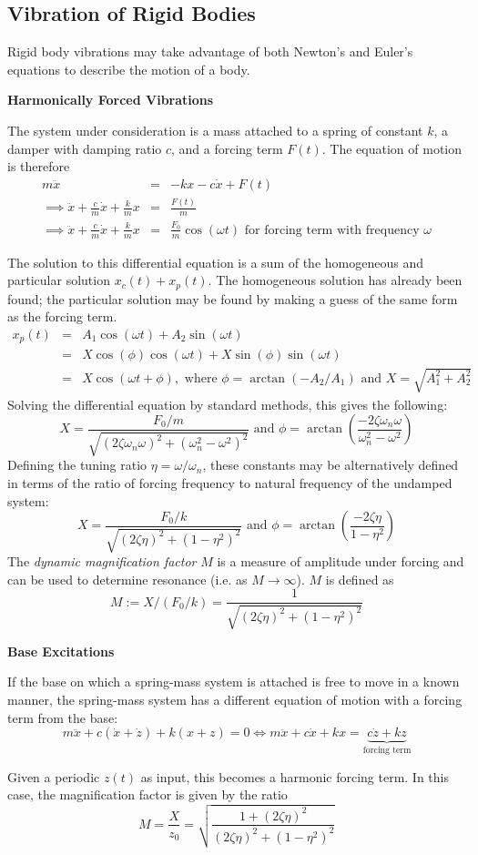 \subsection{Vibration of Rigid Bodies}

Rigid body vibrations may take advantage of both Newton's and Euler's equations to describe the motion of a body.

\textbf{Harmonically Forced Vibrations}

The system under consideration is a mass attached to a spring of constant $k$, a damper with damping ratio $c$, and a forcing term $F(t)$. The equation of motion is therefore \begin{eqnarray*}
    m\ddot x &=& -kx -c\dot x +F(t)\\
    \implies \ddot x + \frac{c}{m}\dot x + \frac{k}{m}x &=& \frac{F(t)}{m}\\
    \implies \ddot x + \frac{c}{m}\dot x + \frac{k}{m} x &=& \frac{F_0}{m}\cos(\omega t)\text{ for forcing term with frequency } \omega
\end{eqnarray*}

The solution to this differential equation is a sum of the homogeneous and particular solution $x_c(t) + x_p(t)$. The homogeneous solution has already been found; the particular solution may be found by making a guess of the same form as the forcing term.
\begin{eqnarray*}
    x_p(t) &=& A_1\cos(\omega t)+A_2\sin(\omega t)\\
    &=& X\cos(\phi)\cos(\omega t)+X\sin(\phi)\sin(\omega t)\\
    &=& X\cos(\omega t + \phi),\text{ where }\phi=\arctan(-A_2/A_1)\text{ and } X=\sqrt{A_1^2+A_2^2}
\end{eqnarray*}
Solving the differential equation by standard methods, this gives the following: \[X = \frac{F_0/m}{\sqrt{(2\zeta \omega_n\omega)^2+(\omega_n^2-\omega^2)^2}}\text{ and } \phi = \arctan\left(\frac{-2\zeta\omega_n\omega}{\omega_n^2-\omega^2}\right)\]
Defining the tuning ratio $\eta = \omega/\omega_n$, these constants may be alternatively defined in terms of the ratio of forcing frequency to natural frequency of the undamped system:
\[X=\frac{F_0/k}{\sqrt{(2\zeta\eta)^2+(1-\eta^2)^2}}\text{ and }\phi = \arctan\left(\frac{-2\zeta\eta}{1-\eta^2}\right)\] The \textit{dynamic magnification factor} $M$ is a measure of amplitude under forcing and can be used to determine resonance (i.e. as $M\to \infty$). $M$ is defined as \[M:= X/(F_0/k) = \frac{1}{\sqrt{(2\zeta\eta)^2+(1-\eta^2)^2}}\]

\textbf{Base Excitations}

If the base on which a spring-mass system is attached is free to move in a known manner, the spring-mass system has a different equation of motion with a forcing term from the base:
\[m\ddot x + c(\dot x+\dot z) + k(x+z) = 0 \iff m\ddot x + c\dot x + kx = \underbrace{c\dot z + kz}_\text{forcing term}\]

Given a periodic $z(t)$ as input, this becomes a harmonic forcing term. In this case, the magnification factor is given by the ratio \[M = \frac{X}{z_0} = \sqrt{\frac{1+(2\zeta\eta)^2}{(2\zeta\eta)^2+(1-\eta^2)^2}}\]